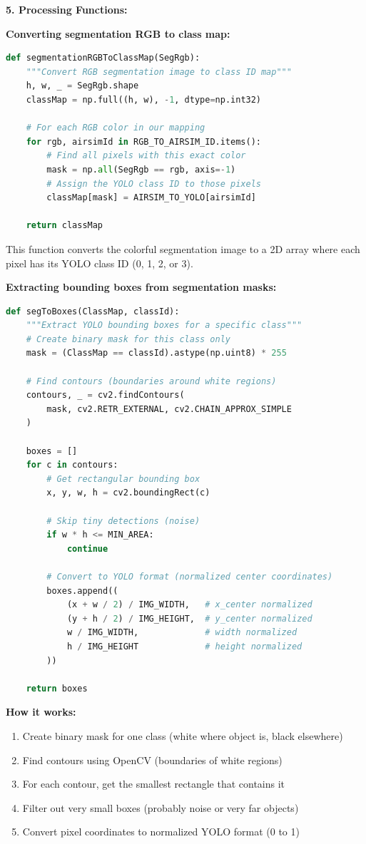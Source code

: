 \textbf{5. Processing Functions:}

\textbf{Converting segmentation RGB to class map:}
\begin{lstlisting}[language=Python]
def segmentationRGBToClassMap(SegRgb):
    """Convert RGB segmentation image to class ID map"""
    h, w, _ = SegRgb.shape
    classMap = np.full((h, w), -1, dtype=np.int32)
    
    # For each RGB color in our mapping
    for rgb, airsimId in RGB_TO_AIRSIM_ID.items():
        # Find all pixels with this exact color
        mask = np.all(SegRgb == rgb, axis=-1)
        # Assign the YOLO class ID to those pixels
        classMap[mask] = AIRSIM_TO_YOLO[airsimId]
    
    return classMap
\end{lstlisting}

This function converts the colorful segmentation image to a 2D array where each pixel has its YOLO class ID (0, 1, 2, or 3).

\textbf{Extracting bounding boxes from segmentation masks:}
\begin{lstlisting}[language=Python]
def segToBoxes(ClassMap, classId):
    """Extract YOLO bounding boxes for a specific class"""
    # Create binary mask for this class only
    mask = (ClassMap == classId).astype(np.uint8) * 255
    
    # Find contours (boundaries around white regions)
    contours, _ = cv2.findContours(
        mask, cv2.RETR_EXTERNAL, cv2.CHAIN_APPROX_SIMPLE
    )
    
    boxes = []
    for c in contours:
        # Get rectangular bounding box
        x, y, w, h = cv2.boundingRect(c)
        
        # Skip tiny detections (noise)
        if w * h <= MIN_AREA:
            continue
        
        # Convert to YOLO format (normalized center coordinates)
        boxes.append((
            (x + w / 2) / IMG_WIDTH,   # x_center normalized
            (y + h / 2) / IMG_HEIGHT,  # y_center normalized
            w / IMG_WIDTH,             # width normalized
            h / IMG_HEIGHT             # height normalized
        ))
    
    return boxes
\end{lstlisting}

\textbf{How it works:}
\begin{enumerate}
	\item Create binary mask for one class (white where object is, black elsewhere)
	\item Find contours using OpenCV (boundaries of white regions)
	\item For each contour, get the smallest rectangle that contains it
	\item Filter out very small boxes (probably noise or very far objects)
	\item Convert pixel coordinates to normalized YOLO format (0 to 1)
\end{enumerate}

